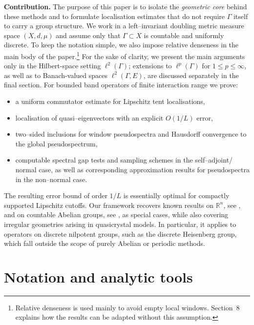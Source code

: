 \documentclass[11pt]{article}
\theoremstyle{definition}
\newcommand{\R}{\mathbb{R}}
\begin{document}
\medskip

\noindent\textbf{Contribution.}
The purpose of this paper is to isolate the \emph{geometric core} behind these
methods and to formulate localisation estimates that do not require $\Gamma$
itself to carry a group structure.
We work in a left--invariant doubling metric measure space $(X,d,\mu)$ and assume
only that $\Gamma\subset X$ is countable and uniformly discrete. To keep the notation
simple, we also impose relative denseness in the main body of the paper.\footnote{Relative denseness is used mainly to avoid empty local windows. Section~8 explains how the results can be adapted without this
assumption.} For the sake of clarity, we present the main arguments only in the Hilbert-space setting $\ell^2(\Gamma)$; extensions to $\ell^p(\Gamma)$ for $1\le p\le\infty$, as well as to Banach-valued spaces $\ell^2(\Gamma,E)$, are discussed separately in the final section.
For bounded band operators of finite interaction range we prove:

\begin{itemize}[leftmargin=2em]
\item a uniform commutator estimate for Lipschitz tent localisations,
\item localisation of quasi--eigenvectors with an explicit $O(1/L)$ error,
\item two--sided inclusions for window pseudospectra and Hausdorff convergence
      to the global pseudospectrum,
\item computable spectral gap tests and sampling schemes in the self--adjoint/ normal case, as well as corresponding approximation results for
      pseudospectra in the non--normal case.
\end{itemize}

The resulting error bound of order $1/L$ is essentially optimal for compactly supported
Lipschitz cutoffs.
Our framework recovers known results on $\R^n$, see \cite{HegeMoscolariTeufel2026}, and on countable Abelian groups, see \cite{LindnerSeifertChandlerWildePreprint}, as special
cases, while also covering irregular geometries arising in quasicrystal models.
In particular, it applies to operators on discrete nilpotent groups, such as the
discrete Heisenberg group, which fall outside the scope of purely Abelian or
periodic methods.

\section{Notation and analytic tools}
\label{sec:tools}
\end{document}

